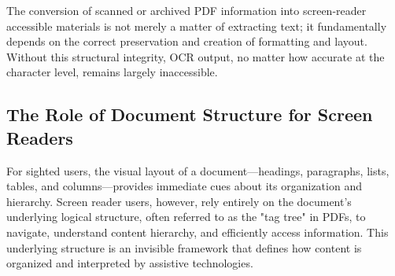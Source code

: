 The conversion of scanned or archived PDF information into screen-reader accessible materials is not merely a matter of extracting text; it fundamentally depends on the correct preservation and creation of formatting and layout. Without this structural integrity, OCR output, no matter how accurate at the character level, remains largely inaccessible.

\subsection{The Role of Document Structure for Screen Readers}

For sighted users, the visual layout of a document—headings, paragraphs, lists, tables, and columns—provides immediate cues about its organization and hierarchy. Screen reader users, however, rely entirely on the document's underlying logical structure, often referred to as the "tag tree" in PDFs, to navigate, understand content hierarchy, and efficiently access information. This underlying structure is an invisible framework that defines how content is organized and interpreted by assistive technologies.

